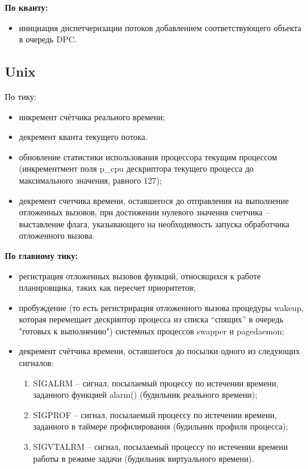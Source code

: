 \textbf{По кванту:}
\begin{itemize}[label=---]
	\item инициация диспетчеризации потоков добавлением соответствующего объекта в очередь DPC.
\end{itemize}

\subsection{Unix}

По тику:

\begin{itemize}[label=---]
	\item инкремент счётчика реального времени;
	\item декремент кванта текущего потока.
	\item обновление статистики использования процессора текущим процессом (инкрементмент поля p\_cpu дескриптора текущего процесса до максимального значения, равного 127);
	\item декремент счетчика времени, оставшегося до отправления на выполнение отложенных вызовов, при достижении нулевого значения счетчика -- выставление флага, указывающего на необходимость запуска обработчика отложенного вызова.
\end{itemize}

\textbf{По главному тику:} 
\begin{itemize}[label=---]
	\item регистрация отложенных вызовов функций, относящихся к работе планировщика,
	таких как пересчет приоритетов;
	\item пробуждение (то есть регистрирация отложенного вызова процедуры wakeup, которая перемещает дескриптор процесса из списка “спящих” в очередь "готовых к выполнению") системных процессов {\ttfamily swapper} и {\ttfamily pagedaemon};
	\item декремент счётчика времени, оставшегося до посылки одного из следующих сигналов:\clearpage
	\begin{enumerate}
		\item {\ttfamily SIGALRM} – сигнал, посылаемый процессу по истечении времени, заданного функцией {\ttfamily alarm()} (будильник реального времени);
		\item {\ttfamily SIGPROF} –  сигнал, посылаемый процессу по истечении времени, заданного в таймере профилирования (будильник профиля процесса);
		\item {\ttfamily SIGVTALRM} –  сигнал, посылаемый процессу по истечении времени работы в режиме задачи (будильник виртуального времени).
	\end{enumerate}
\end{itemize}

